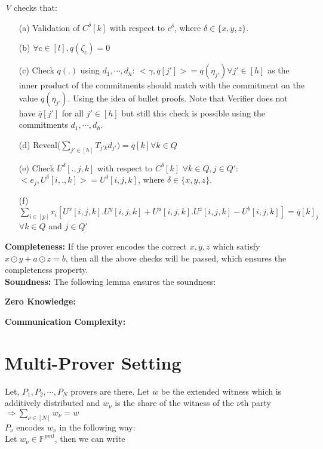 \textit{V} checks that:
\begin{itemize}
	\item[(a)] Validation of $C^{\delta}[k]$ with respect to $c^{\delta}$, where $\delta\in\{x,y,z\}$. 
	\item[(b)] $\forall c\in[l], q(\zeta_c)=0$
	\item[(c)] Check $q(.)$ using $d_1,\cdots,d_h$: $<\gamma,\overline{q}[j']>=q(\eta_{j'})\forall j'\in[h]$ as the inner product of the commitments should match with the commitment on the value $q(\eta_{j'})$. Using the idea of bullet proofs. Note that Verifier does not have $\overline{q}[j'] $ for all $j'\in[h]$ but still this check is possible using the commitments $d_1,\cdots, d_h$.
	\item[(d)] Reveal($\sum\limits_{j'\in [h]} T_{j'k} d_{j'})=\overline{q}[k] \forall k\in Q$
	\item[(e)] Check $U^{\delta}[.,j,k]$ with respect to $C^{\delta}[k]$ $\forall k\in Q,  j\in Q'$: $<e_j,U^{\delta}[i,.,k]>=U^{\delta}[i,j,k]$, where $\delta\in\{x,y,z\}$. 
	\item[(f)] $\sum\limits_{i\in[p]} r_{i}[U^x[i,j,k].U^y[i,j,k]+U^a[i,j,k].U^z[i,j,k]-U^b[i,j,k]]=\overline{q}[k]_j$ $\forall k\in Q$ and $j\in Q'$\\
\end{itemize}

\textbf{Completeness:} If the prover encodes the correct $x,y,z$ which satisfy $x\odot y + a\odot z=b$, then all the above checks will be passed, which ensures the completeness property.\\

\textbf{Soundness:} The following lemma ensures the soundness:

\begin{lemma}
		
\end{lemma}

\textbf{Zero Knowledge:}

\textbf{Communication Complexity:}
\section{Multi-Prover Setting}

Let, $P_1,P_2,\cdots,P_N$ provers are there. Let $w$ be the extended witness which is additively distributed and $w_{\nu}$ is the share of the witness of the $\nu$th party $\Rightarrow \sum\limits_{\nu \in [N]}w_{\nu}=w$\\
$P_{\nu}$ encodes $w_{\nu}$ in the following way:\\
Let $w_{\nu}\in \mathbb{F}^{pml}$, then we can write 

